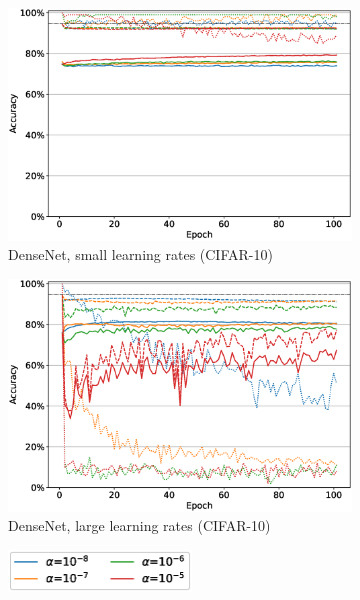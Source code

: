 \begin{figure}
\begin{subfigure}[b]{0.49\textwidth}
         \centering
         \includegraphics[width=\textwidth]{images/finetuning/finetuning_protecting_content_smalllr_thesis_densenet.eps}
         \caption{DenseNet, small learning rates (CIFAR-10)}
         \label{fig:finetuning_densenet_smalllr}
     \end{subfigure}
     \hfill
     \begin{subfigure}[b]{0.49\textwidth}
         \centering
         \includegraphics[width=\textwidth]{images/finetuning/finetuning_protecting_content_largelr_thesis_densenet.eps}
         \caption{DenseNet, large learning rates (CIFAR-10)}
         \label{fig:finetuning_densenet_largelr}
     \end{subfigure}
     \hfill
     \begin{subfigure}[b]{\textwidth}
         \centering
         \includegraphics[height=1.1cm]{images/finetuning/legend_content_finetuning_smalllr_colors.eps}

\end{subfigure}
\end{figure}
